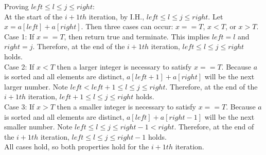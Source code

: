 \documentclass{article}
\begin{document}
\begin{enumerate}
		Proving $left\leq l\leq j\leq right$:\\
		At the start of the $i+1th$ iteration, by I.H., $left\leq l\leq j\leq right$. Let $x=a[left]+a[right]$. Then three cases can occur: $x==T$, $x<T$, or $x>T$.\\
		Case 1: If $x==T$, then return true and terminate. This implies $left=l$ and $right=j$. Therefore, at the end of the $i+1th$ iteration, $left\leq l\leq j\leq right$ holds.\\
		Case 2: If $x<T$ then a larger integer is necessary to satisfy $x==T$. Because $a$ is sorted and all elements are distinct, $a[left+1]+a[right]$ will be the next larger number. Note $left<left+1\leq l\leq j\leq right$. Therefore, at the end of the $i+1th$ iteration, $left+1\leq l\leq j\leq right$ holds.\\
		Case 3: If $x>T$ then a smaller integer is necessary to satisfy $x==T$. Because $a$ is sorted and all elements are distinct, $a[left]+a[right-1]$ will be the next smaller number. Note $left\leq l\leq j\leq right-1<right$. Therefore, at the end of the $i+1th$ iteration, $left\leq l\leq j\leq right-1$ holds.\\
		All cases hold, so both properties hold for the $i+1th$ iteration.
	\end{enumerate}
 
\end{document}
